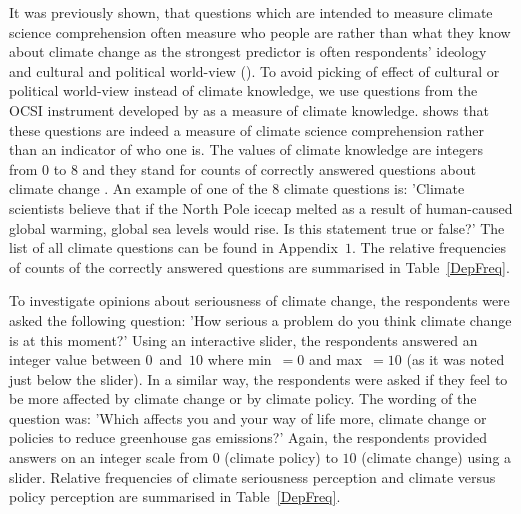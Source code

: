 \documentclass[a4paper,12pt]{article}
\begin{document}
It was previously shown, that questions which are intended to measure climate science comprehension often measure who people are rather than what they know about climate change as the strongest predictor is often respondents' ideology and cultural and political world-view (\citealp{Hamilton2011, KahanEtAl2012, Kahan2015}). To avoid picking of effect of cultural or political world-view instead of climate knowledge, we use questions from the OCSI instrument developed by \citet{Kahan2015} as a measure of climate knowledge. \citet{Kahan2015} shows that these questions are indeed a measure of climate science comprehension rather than an indicator of who one is. The values of climate knowledge are integers from $0$ to $8$ and they stand for counts of correctly answered questions about climate change \citep{Kahan2015}. An example of one of the $8$ climate questions is: 'Climate scientists believe that if the North Pole icecap melted as a result of human-caused global warming, global sea levels would rise. Is this statement true or false?' The list of all climate questions can be found in Appendix~$1$. The relative frequencies of counts of the correctly answered questions are summarised in Table~\ref{DepFreq}.

To investigate opinions about seriousness of climate change, the respondents were asked the following question: 'How serious a problem do you think climate change is at this moment?' Using an interactive slider, the respondents answered an integer value between $0$~and~$10$ where min~$=0$ and max~$=10$ (as it was noted just below the slider). In a similar way, the respondents were asked if they feel to be more affected by climate change or by climate policy. The wording of the question was: 'Which affects you and your way of life more, climate change or policies to reduce greenhouse gas emissions?' Again, the respondents provided answers on an integer scale from $0$ (climate policy) to $10$ (climate change) using a slider. Relative frequencies of climate seriousness perception and climate versus policy perception are summarised in Table~\ref{DepFreq}.


\vspace{1cm}
\end{document}
